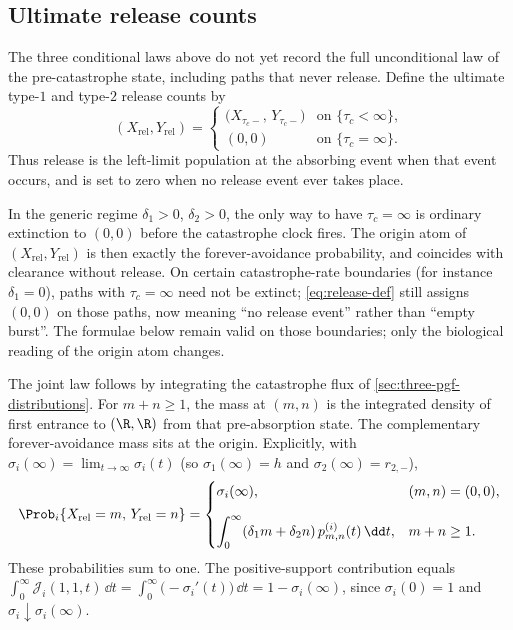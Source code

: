 \subsection{Ultimate release counts}
\label{sec:ultimate-release}

The three conditional laws above do not yet record the full unconditional law of the pre-catastrophe state, including paths that never release. Define the ultimate type-$1$ and type-$2$ release counts by
\begin{equation}
\label{eq:release-def}
(X_{\mathrm{rel}},Y_{\mathrm{rel}})
=
\begin{cases}
\bigl(X_{\tau_{\!c}-},\,Y_{\tau_{\!c}-}\bigr)
& \text{on }\{\tau_{\!c}<\infty\},\\[0.35em]
(0,0)
& \text{on }\{\tau_{\!c}=\infty\}.
\end{cases}
\end{equation}
Thus release is the left-limit population at the absorbing event when that event occurs, and is set to zero when no release event ever takes place.

\begin{remark}
\label{rem:release-origin}
In the generic regime $\delta_1>0$, $\delta_2>0$, the only way to have $\tau_{\!c}=\infty$ is ordinary extinction to $(0,0)$ before the catastrophe clock fires. The origin atom of $(X_{\mathrm{rel}},Y_{\mathrm{rel}})$ is then exactly the forever-avoidance probability, and coincides with clearance without release. On certain catastrophe-rate boundaries (for instance $\delta_1=0$), paths with $\tau_{\!c}=\infty$ need not be extinct; \cref{eq:release-def} still assigns $(0,0)$ on those paths, now meaning ``no release event'' rather than ``empty burst''. The formulae below remain valid on those boundaries; only the biological reading of the origin atom changes.
\end{remark}

The joint law follows by integrating the catastrophe flux of \cref{sec:three-pgf-distributions}. For $m+n\ge 1$, the mass at $(m,n)$ is the integrated density of first entrance to $(\R,\R)$ from that pre-absorption state. The complementary forever-avoidance mass sits at the origin. Explicitly, with $\sigma_i(\infty)=\lim_{t\to\infty}\sigma_i(t)$ (so $\sigma_1(\infty)=h$ and $\sigma_2(\infty)=r_{2,-}$),
\begin{equation}
\label{eq:release-joint-pmf}
\Prob_i\{X_{\mathrm{rel}}=m,\,Y_{\mathrm{rel}}=n\}
=
\begin{cases}
\displaystyle
\sigma_i(\infty),
& (m,n)=(0,0),\\[1.0em]
\displaystyle
\int_0^\infty
(\delta_1 m+\delta_2 n)\,
p_{m,n}^{(i)}(t)\,
\dd t,
& m+n\ge 1.
\end{cases}
\end{equation}
These probabilities sum to one. The positive-support contribution equals
$\int_0^\infty\mathcal J_i(1,1,t)\,\dd t=\int_0^\infty\bigl(-\sigma_i'(t)\bigr)\,\dd t=1-\sigma_i(\infty)$,
since $\sigma_i(0)=1$ and $\sigma_i\downarrow\sigma_i(\infty)$.

